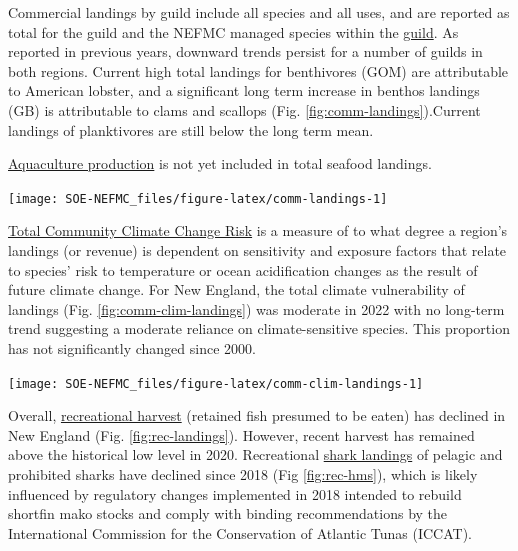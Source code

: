 \documentclass[
  10pt,
]{article}
\let\origfigure\figure
\let\endorigfigure\endfigure
\renewenvironment{figure}[1][2] {
    \expandafter\origfigure\expandafter[H]
} {
    \endorigfigure
}
\begin{document}
Commercial landings by guild include all species and all uses, and are reported as total for the guild and the NEFMC managed species within the \href{https://noaa-edab.github.io/catalog/aggregate_biomass.html}{guild}. As reported in previous years, downward trends persist for a number of guilds in both regions. Current high total landings for benthivores (GOM) are attributable to American lobster, and a significant long term increase in benthos landings (GB) is attributable to clams and scallops (Fig. \ref{fig:comm-landings}).Current landings of planktivores are still below the long term mean.

\href{https://noaa-edab.github.io/catalog/aquaculture.html}{Aquaculture production} is not yet included in total seafood landings.

\begin{figure}

{\centering \texttt{[image: SOE-NEFMC\_files/figure-latex/comm-landings-1]} 

}

\caption{Total commercial landings (black) and NEFMC managed U.S seafood landings (red) by feeding guild for the Gulf of Maine (GOM, right) and Georges Bank (GB, left).}\label{fig:comm-landings}
\end{figure}

\href{https://noaa-edab.github.io/catalog/community_climate_vulnerability.html}{Total Community Climate Change Risk} is a measure of to what degree a region's landings (or revenue) is dependent on sensitivity and exposure factors that relate to species' risk to temperature or ocean acidification changes as the result of future climate change. For New England, the total climate vulnerability of landings (Fig. \ref{fig:comm-clim-landings}) was moderate in 2022 with no long-term trend suggesting a moderate reliance on climate-sensitive species. This proportion has not significantly changed since 2000.

\begin{figure}

{\centering \texttt{[image: SOE-NEFMC\_files/figure-latex/comm-clim-landings-1]} 

}

\caption{Total climate vulnerability on New England landings from 2000 to 2022. Horizontal colored bars show different climate risk levels.}\label{fig:comm-clim-landings}
\end{figure}

Overall, \href{https://noaa-edab.github.io/catalog/recdat.html}{recreational harvest} (retained fish presumed to be eaten) has declined in New England (Fig. \ref{fig:rec-landings}). However, recent harvest has remained above the historical low level in 2020. Recreational \href{https://noaa-edab.github.io/catalog/rec_hms.html}{shark landings} of pelagic and prohibited sharks have declined since 2018 (Fig \ref{fig:rec-hms}), which is likely influenced by regulatory changes implemented in 2018 intended to rebuild shortfin mako stocks and comply with binding recommendations by the International Commission for the Conservation of Atlantic Tunas (ICCAT).
\end{document}
